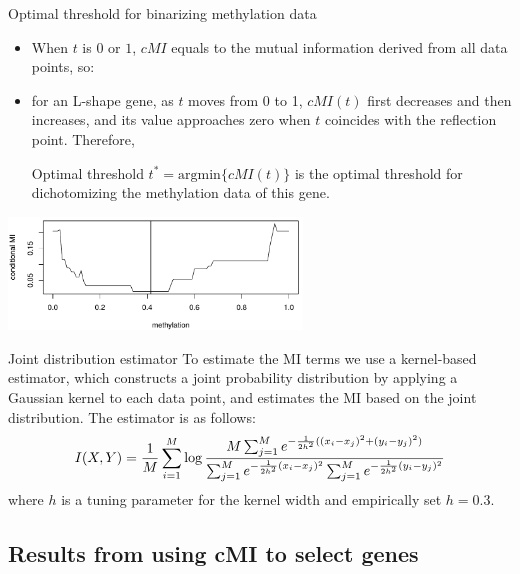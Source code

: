 \documentclass[handout]{beamer}
\begin{document}
\begin{frame} {Optimal threshold for binarizing methylation data}
\begin{itemize}
\item When $t$ is $0$ or $1$, $\mathit{cMI}$ equals to the mutual information derived 
from all data points, so:
\item 
for an L-shape gene, as $t$ moves from 0 to 1, $\mathit{cMI}(t)$ first decreases and then
increases, and its value approaches zero when $t$ coincides with the reflection point. 
Therefore,
\begin{block}{Optimal threshold}
$t^{\ast} = \mathrm{argmin}\{ \mathit{cMI}(t) \}$ is the optimal threshold for 
dichotomizing the methylation data of this gene.
\end{block}
\end{itemize}

\begin{center}
\includegraphics[height=3cm]{./images/cMI-methylation.png}
\end{center}
\end{frame}

\begin{frame}{Joint distribution estimator}
To estimate the MI terms we use a kernel-based estimator, which constructs a joint
probability distribution by applying a Gaussian kernel to each data point, and estimates
the MI based on the joint distribution. The estimator is as follows:
\[
I(X,Y) = \frac 1M \sum_{i=1}^M \log\frac{M\sum_{j=1}^M e^{-\frac{1}{2h^2}((x_i-x_j)^2+(y_i-y_j)^2)}}{%
                                      \sum_{j=1}^M e^{-\frac{1}{2h^2}(x_i-x_j)^2} \sum_{j=1}^M e^{-\frac{1}{2h^2}(y_i-y_j)^2}}
\]
where $h$ is a tuning parameter for the kernel width and empirically set $h=0.3$.
\end{frame}

\subsection{Results from using cMI to select genes}
\end{document}
